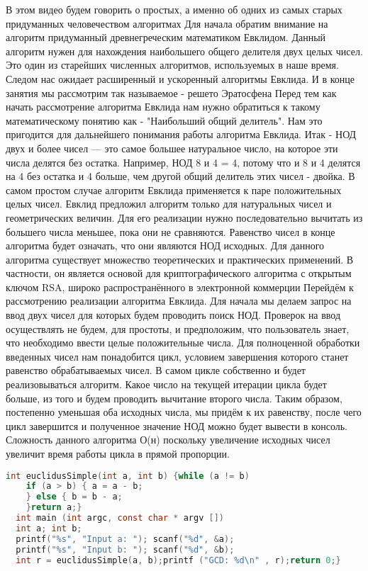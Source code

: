 \documentclass[fontsize=14bp]{report}
\begin{document}
В этом видео будем говорить о простых, а именно об одних из самых старых придуманных человечеством алгоритмах
Для начала обратим внимание на алгоритм придуманный древнегреческим математиком Евклидом. Данный алгоритм нужен для нахождения наибольшего общего делителя двух целых чисел. Это один из старейших численных алгоритмов, используемых в наше время. Следом нас ожидает расширенный и ускоренный алгоритмы Евклида. И в конце занятия мы рассмотрим так называемое - решето Эратосфена
Перед тем как начать рассмотрение алгоритма Евклида нам нужно обратиться к такому математическому понятию как - "Наибольший общий делитель". Нам это пригодится для дальнейшего понимания работы алгоритма Евклида. Итак - НОД двух и более чисел — это самое большее натуральное число, на которое эти числа делятся без остатка. Например, НОД 8 и 4 = 4, потому что и 8 и 4 делятся на 4 без остатка и 4 больше, чем другой общий делитель этих чисел - двойка. В самом простом случае алгоритм Евклида применяется к паре положительных целых чисел. Евклид предложил алгоритм только для натуральных чисел и геометрических величин. Для его реализации нужно последовательно вычитать из большего числа меньшее, пока они не сравняются. Равенство чисел в конце алгоритма будет означать, что они являются НОД исходных. Для данного алгоритма существует множество теоретических и практических применений. В частности, он является основой для криптографического алгоритма с открытым ключом RSA, широко распространённого в электронной коммерции
Перейдём к рассмотрению реализации алгоритма Евклида. Для начала мы делаем запрос на ввод двух чисел для которых будем проводить поиск НОД. Проверок на ввод осуществлять не будем, для простоты, и предположим, что пользователь знает, что необходимо ввести целые положительные числа. Для полноценной обработки введенных чисел нам понадобится цикл, условием завершения которого станет равенство обрабатываемых чисел. В самом цикле собственно и будет реализовываться алгоритм. Какое число на текущей итерации цикла будет больше, из того и будем проводить вычитание второго числа. Таким образом, постепенно уменьшая оба исходных числа, мы придём к их равенству, после чего цикл завершится и полученное значение НОД можно будет вывести в консоль. Сложность данного алгоритма О(н) поскольку увеличение исходных чисел увеличит время работы цикла в прямой пропорции.

\begin{lstlisting}[language=C,style=CCodeStyle]
  int euclidusSimple(int a, int b) {while (a != b)
    if (a > b) { a = a - b;
    } else { b = b - a;
    }return a;}
  int main (int argc, const char * argv [])
  int a; int b;
  printf("%s", "Input a: "); scanf("%d", &a);
  printf("%s", "Input b: "); scanf("%d", &b);
  int r = euclidusSimple(a, b);printf ("GCD: %d\n" , r);return 0;}
\end{lstlisting}
\end{document}
